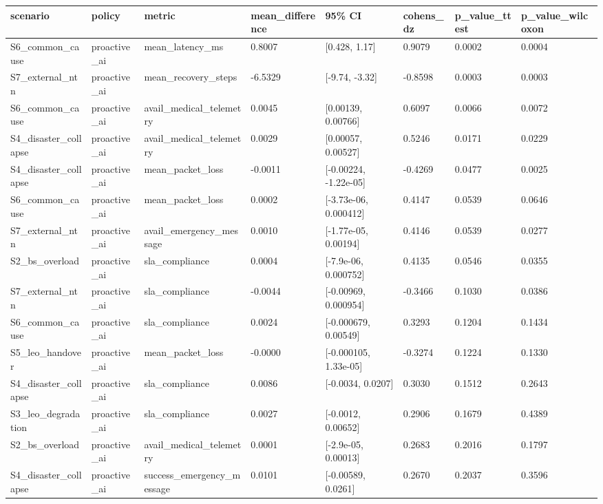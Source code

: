 \begin{tabular}{llllllll}
\toprule
scenario & policy & metric & mean\_difference & 95\% CI & cohens\_dz & p\_value\_ttest & p\_value\_wilcoxon \\
\midrule
S6\_common\_cause & proactive\_ai & mean\_latency\_ms & 0.8007 & [0.428, 1.17] & 0.9079 & 0.0002 & 0.0004 \\
S7\_external\_ntn & proactive\_ai & mean\_recovery\_steps & -6.5329 & [-9.74, -3.32] & -0.8598 & 0.0003 & 0.0003 \\
S6\_common\_cause & proactive\_ai & avail\_medical\_telemetry & 0.0045 & [0.00139, 0.00766] & 0.6097 & 0.0066 & 0.0072 \\
S4\_disaster\_collapse & proactive\_ai & avail\_medical\_telemetry & 0.0029 & [0.00057, 0.00527] & 0.5246 & 0.0171 & 0.0229 \\
S4\_disaster\_collapse & proactive\_ai & mean\_packet\_loss & -0.0011 & [-0.00224, -1.22e-05] & -0.4269 & 0.0477 & 0.0025 \\
S6\_common\_cause & proactive\_ai & mean\_packet\_loss & 0.0002 & [-3.73e-06, 0.000412] & 0.4147 & 0.0539 & 0.0646 \\
S7\_external\_ntn & proactive\_ai & avail\_emergency\_message & 0.0010 & [-1.77e-05, 0.00194] & 0.4146 & 0.0539 & 0.0277 \\
S2\_bs\_overload & proactive\_ai & sla\_compliance & 0.0004 & [-7.9e-06, 0.000752] & 0.4135 & 0.0546 & 0.0355 \\
S7\_external\_ntn & proactive\_ai & sla\_compliance & -0.0044 & [-0.00969, 0.000954] & -0.3466 & 0.1030 & 0.0386 \\
S6\_common\_cause & proactive\_ai & sla\_compliance & 0.0024 & [-0.000679, 0.00549] & 0.3293 & 0.1204 & 0.1434 \\
S5\_leo\_handover & proactive\_ai & mean\_packet\_loss & -0.0000 & [-0.000105, 1.33e-05] & -0.3274 & 0.1224 & 0.1330 \\
S4\_disaster\_collapse & proactive\_ai & sla\_compliance & 0.0086 & [-0.0034, 0.0207] & 0.3030 & 0.1512 & 0.2643 \\
S3\_leo\_degradation & proactive\_ai & sla\_compliance & 0.0027 & [-0.0012, 0.00652] & 0.2906 & 0.1679 & 0.4389 \\
S2\_bs\_overload & proactive\_ai & avail\_medical\_telemetry & 0.0001 & [-2.9e-05, 0.00013] & 0.2683 & 0.2016 & 0.1797 \\
S4\_disaster\_collapse & proactive\_ai & success\_emergency\_message & 0.0101 & [-0.00589, 0.0261] & 0.2670 & 0.2037 & 0.3596 \\

\end{tabular}
